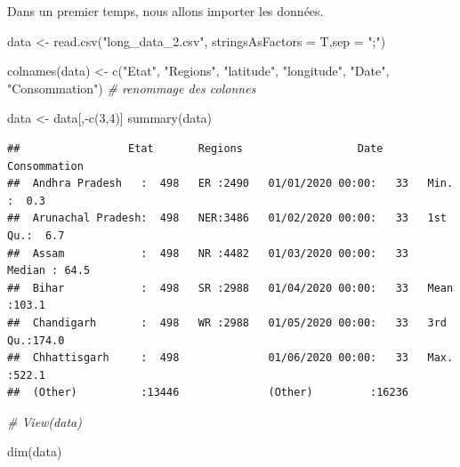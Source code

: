 \documentclass[
]{article}
\newenvironment{Shaded}{\begin{snugshade}}{\end{snugshade}}
\newcommand{\AttributeTok}[1]{\textcolor[rgb]{0.77,0.63,0.00}{#1}}
\newcommand{\CommentTok}[1]{\textcolor[rgb]{0.56,0.35,0.01}{\textit{#1}}}
\newcommand{\DecValTok}[1]{\textcolor[rgb]{0.00,0.00,0.81}{#1}}
\newcommand{\FunctionTok}[1]{\textcolor[rgb]{0.00,0.00,0.00}{#1}}
\newcommand{\NormalTok}[1]{#1}
\newcommand{\OtherTok}[1]{\textcolor[rgb]{0.56,0.35,0.01}{#1}}
\newcommand{\SpecialCharTok}[1]{\textcolor[rgb]{0.00,0.00,0.00}{#1}}
\newcommand{\StringTok}[1]{\textcolor[rgb]{0.31,0.60,0.02}{#1}}
\begin{document}
Dans un premier temps, nous allons importer les données.

\begin{Shaded}
\begin{Highlighting}[]
\NormalTok{data }\OtherTok{\textless{}{-}} \FunctionTok{read.csv}\NormalTok{(}\StringTok{"long\_data\_2.csv"}\NormalTok{, }\AttributeTok{stringsAsFactors =}\NormalTok{ T,}\AttributeTok{sep =} \StringTok{";"}\NormalTok{)}

\FunctionTok{colnames}\NormalTok{(data) }\OtherTok{\textless{}{-}} \FunctionTok{c}\NormalTok{(}\StringTok{"Etat"}\NormalTok{, }\StringTok{"Regions"}\NormalTok{, }\StringTok{"latitude"}\NormalTok{, }\StringTok{"longitude"}\NormalTok{, }
                    \StringTok{"Date"}\NormalTok{, }\StringTok{"Consommation"}\NormalTok{) }\CommentTok{\# renommage des colonnes}

\NormalTok{data }\OtherTok{\textless{}{-}}\NormalTok{ data[,}\SpecialCharTok{{-}}\FunctionTok{c}\NormalTok{(}\DecValTok{3}\NormalTok{,}\DecValTok{4}\NormalTok{)]}
\FunctionTok{summary}\NormalTok{(data)}
\end{Highlighting}
\end{Shaded}

\begin{verbatim}
##                 Etat       Regions                  Date        Consommation  
##  Andhra Pradesh   :  498   ER :2490   01/01/2020 00:00:   33   Min.   :  0.3  
##  Arunachal Pradesh:  498   NER:3486   01/02/2020 00:00:   33   1st Qu.:  6.7  
##  Assam            :  498   NR :4482   01/03/2020 00:00:   33   Median : 64.5  
##  Bihar            :  498   SR :2988   01/04/2020 00:00:   33   Mean   :103.1  
##  Chandigarh       :  498   WR :2988   01/05/2020 00:00:   33   3rd Qu.:174.0  
##  Chhattisgarh     :  498              01/06/2020 00:00:   33   Max.   :522.1  
##  (Other)          :13446              (Other)         :16236
\end{verbatim}

\begin{Shaded}
\begin{Highlighting}[]
\CommentTok{\# View(data)}
\end{Highlighting}
\end{Shaded}

\begin{Shaded}
\begin{Highlighting}[]
\FunctionTok{dim}\NormalTok{(data)}
\end{Highlighting}
\end{Shaded}
\end{document}
